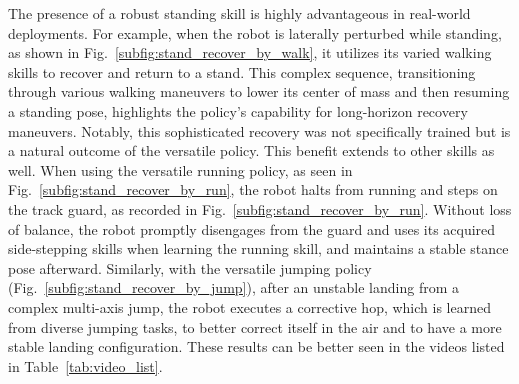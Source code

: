 The presence of a robust standing skill is highly advantageous in real-world deployments.
For example, when the robot is laterally perturbed while standing, as shown in Fig.~\ref{subfig:stand_recover_by_walk}, it utilizes its varied walking skills to recover and return to a stand. This complex sequence, transitioning through various walking maneuvers to lower its center of mass and then resuming a standing pose, highlights the policy's capability for long-horizon recovery maneuvers. 
Notably, this sophisticated recovery was not specifically trained but is a natural outcome of the versatile policy.
This benefit extends to other skills as well. 
When using the versatile running policy, as seen in Fig.~\ref{subfig:stand_recover_by_run}, the robot halts from running and steps on the track guard, as recorded in Fig.~\ref{subfig:stand_recover_by_run}.
Without loss of balance, the robot promptly disengages from the guard and uses its acquired side-stepping skills when learning the running skill, and maintains a stable stance pose afterward.
Similarly, with the versatile jumping policy (Fig.~\ref{subfig:stand_recover_by_jump}), after an unstable landing from a complex multi-axis jump, the robot executes a corrective hop, which is learned from diverse jumping tasks, to better correct itself in the air and to have a more stable landing configuration. These results can be better seen in the videos listed in Table~\ref{tab:video_list}.







